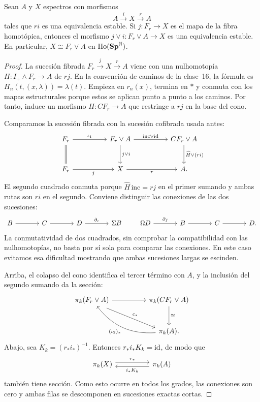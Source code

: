 \begin{prop}\label{prop:c17-retracto-sumando}
Sean $A$ y $X$ espectros con morfismos
\[
A\xrightarrow{i}X\xrightarrow{r}A
\]
tales que $ri$ es una equivalencia estable. Si $j\colon F_r\to X$ es el mapa de la fibra homotópica, entonces el morfismo $j\vee i\colon F_r\vee A\to X$ es una equivalencia estable. En particular, $X\cong F_r\vee A$ en $\operatorname{Ho}(\mathbf{Sp}^{\mathbb N})$.
\end{prop}

\begin{proof}
La sucesión fibrada $F_r\xrightarrow{j}X\xrightarrow{r}A$ viene con una nulhomotopía $H\colon I_+\wedge F_r\to A$ de $rj$. En la convención de caminos de la clase~16, la fórmula es $H_n(t,(x,\lambda))=\lambda(t)$. Empieza en $r_n(x)$, termina en $*$ y conmuta con los mapas estructurales porque estos se aplican punto a punto a los caminos. Por tanto, induce un morfismo $\widehat H\colon CF_r\to A$ que restringe a $rj$ en la base del cono.

Comparamos la sucesión fibrada con la sucesión cofibrada usada antes:
\[
\begin{tikzcd}[column sep=huge,row sep=large]
F_r\arrow[r,"\iota_1"]\arrow[d,equal]
&F_r\vee A\arrow[r,"\mathrm{inc}\vee\id"]\arrow[d,"j\vee i"]
&CF_r\vee A\arrow[d,"\widehat H\vee(ri)"]\\
F_r\arrow[r,"j"']&X\arrow[r,"r"']&A.
\end{tikzcd}
\]
El segundo cuadrado conmuta porque $\widehat H\,\mathrm{inc}=rj$ en el primer sumando y ambas rutas son $ri$ en el segundo. Conviene distinguir las conexiones de las dos sucesiones:
\[
\begin{tikzcd}[column sep=large]
B\arrow[r]&C\arrow[r]&D\arrow[r,"\partial_c"]&\Sigma B
\end{tikzcd}
\qquad
\begin{tikzcd}[column sep=large]
\Omega D\arrow[r,"\partial_f"]&B\arrow[r]&C\arrow[r]&D.
\end{tikzcd}
\]
La conmutatividad de dos cuadrados, sin comprobar la compatibilidad con las nulhomotopías, no basta por sí sola para comparar las conexiones. En este caso evitamos esa dificultad mostrando que ambas sucesiones largas se escinden.

Arriba, el colapso del cono identifica el tercer término con $A$, y la inclusión del segundo sumando da la sección:
\[
\begin{tikzcd}[column sep=huge,row sep=large]
\pi_k(F_r\vee A)\arrow[r]\arrow[dr,"c_*",shift right=.6ex]
&\pi_k(CF_r\vee A)\arrow[d,"\cong"]\\
&\pi_k(A)\arrow[ul,"(\iota_2)_*",bend left=28].
\end{tikzcd}
\]
Abajo, sea $K_k=(r_*i_*)^{-1}$. Entonces $r_*i_*K_k=\operatorname{id}$, de modo que
\[
\begin{tikzcd}[column sep=huge]
\pi_k(X)\arrow[r,"r_*",shift left=.7ex]
&\pi_k(A)\arrow[l,"i_*K_k",shift left=.7ex]
\end{tikzcd}
\]
también tiene sección. Como esto ocurre en todos los grados, las conexiones son cero y ambas filas se descomponen en sucesiones exactas cortas.


\end{proof}
